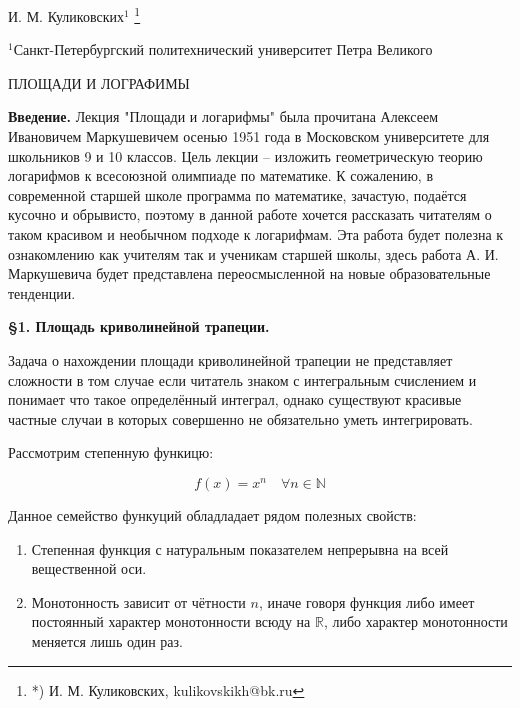 \documentclass[a4paper,12pt]{article}
\newcommand{\blfootnote}[1]{%
	\begingroup
	\renewcommand{\thefootnote}{}%
	\footnote{#1}%
	\addtocounter{footnote}{-1}%
	\endgroup
}
\begin{document}
	\begin{flushright}
		И. М. Куликовских$^{1}$\blfootnote{*) И. М. Куликовских, kulikovskikh@bk.ru}
	\end{flushright}
	
	
	\begin{flushright}
		$^{1}$Санкт-Петербургский политехнический университет Петра Великого
	\end{flushright}

	\begin{center}
		ПЛОЩАДИ И ЛОГРАФИМЫ
	\end{center}
	
	\quad \textbf{Введение.} Лекция "Площади и логарифмы"  была прочитана Алексеем Ивановичем Маркушевичем осенью 1951 года в Московском университете для школьников 9 и 10 классов. Цель лекции -- изложить геометрическую теорию логарифмов к всесоюзной олимпиаде по математике. К сожалению, в современной старшей школе программа по математике, зачастую, подаётся кусочно и обрывисто, поэтому в данной работе хочется рассказать читателям о таком красивом и необычном подходе к логарифмам. Эта работа будет полезна к ознакомлению как учителям так и ученикам старшей школы, здесь работа А. И. Маркушевича будет представлена переосмысленной на новые образовательные тенденции. 
	
	\quad \textbf{\S 1. Площадь криволинейной трапеции.} 
	
	\quad Задача о нахождении площади криволинейной трапеции не представляет сложности в том случае если читатель знаком с интегральным счислением и понимает что такое определённый интеграл, однако существуют красивые частные случаи в которых совершенно не обязательно уметь интегрировать.
	
	\quad Рассмотрим степенную функицю:
	
	\begin{equation}
		f(x) = x^n \quad \forall n \in \mathbb{N}
	\end{equation}
	
	
	\quad Данное семейство функуций обладладает рядом полезных свойств:
	
	\begin{enumerate}
		\item Степенная функция с натуральным показателем непрерывна на всей вещественной оси.
		
		\item Монотонность зависит от чётности $n$, иначе говоря функция либо имеет постоянный характер монотонности всюду на $\mathbb{R}$, либо характер монотонности меняется лишь один раз.
	\end{enumerate}
	
\end{document}

